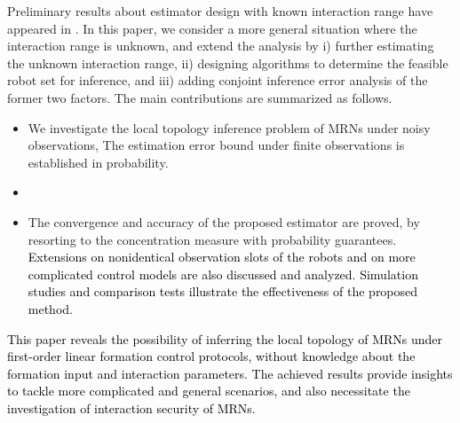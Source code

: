 \documentclass[12pt,journal,draftclsnofoot,onecolumn]{IEEEtran}
\begin{document}
Preliminary results about estimator design with known interaction range have appeared in \cite{lys}. 
In this paper, we consider a more general situation where the interaction range is unknown, and extend the analysis by i) further estimating the unknown interaction range, ii) designing algorithms to determine the feasible robot set for inference, and iii) adding conjoint inference error analysis of the former two factors. 
The main contributions are summarized as follows. 

\begin{itemize}
\item We investigate the local topology inference problem of MRNs under noisy observations, {\color{black}{without the knowledge about the formation input and interaction parameters. 
By characterizing the steady formation pattern, we determine a constant subset from the time-varying set of robots within the observation range, and identify the formation input parameters. }}
The estimation error bound under finite observations is established in probability. 


\item {\color{black}{
Leveraging the interaction constraints between formation robots, we develop an active excitation based method to obtain a reliable estimate of the interaction range. 
Combining the novel range-shrink strategy and the monotonicity analysis of the interaction range, the influence of unobservable robots is perfectly avoided. 
Then, an ordinary least squares (OLS) based local topology estimator is established after filtering the formation input's influence on observations before the steady stage. }}


\item 
The convergence and accuracy of the proposed estimator are proved, by resorting to the concentration measure with probability guarantees. 
\textcolor{black}{
Extensions on nonidentical observation slots of the robots and on more complicated control models are also discussed and analyzed. 
Simulation studies and comparison tests illustrate the effectiveness of the proposed method.  }
\end{itemize}

\textcolor{black}{
This paper reveals the possibility of inferring the local topology of MRNs under first-order linear formation control protocols, without knowledge about the formation input and interaction parameters. 
The achieved results provide insights to tackle more complicated and general scenarios, and also necessitate the investigation of interaction security of MRNs. 
}
\end{document}
